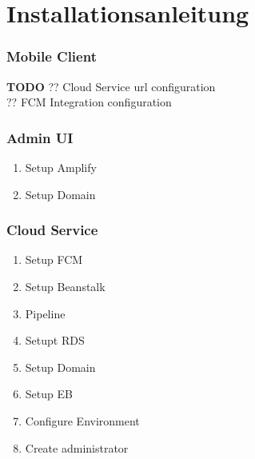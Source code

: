
\section{Installationsanleitung}

\subsubsection*{Mobile Client}
\textbf{TODO}
?? Cloud Service url configuration \\
?? FCM Integration configuration \\

\subsubsection*{Admin UI}
\begin{enumerate}
    \item Setup Amplify
    \item Setup Domain
\end{enumerate}

\subsubsection*{Cloud Service}

\begin{enumerate}
    \item Setup FCM
    \item Setup Beanstalk
    \item Pipeline
    \item Setupt RDS
    \item Setup Domain
    \item Setup EB
    \item Configure Environment
    \item Create administrator
\end{enumerate}
